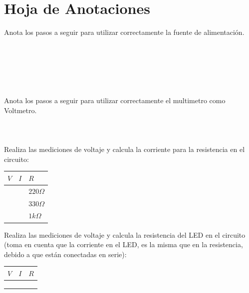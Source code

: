 
\clearpage
\section{Hoja de Anotaciones}
	Anota los pasos a seguir para utilizar correctamente la fuente de alimentación. \\ \\ \\ \\ \\ \\ \\

	Anota los pasos a seguir para utilizar correctamente el multimetro como Voltmetro. \\ \\ \\ \\

	Realiza las mediciones de voltaje y calcula la corriente para la resistencia en el circuito:

	\begin{center}
		\begin{tabular}{|p{1.5cm}|p{1.5cm}|p{1.5cm}|}
			\hline
			$V$ & $I$ & $R$          \\
			\hline
			    &     & $220 \Omega$ \\
			\hline
			    &     & $330 \Omega$ \\
			\hline
			    &     & $1 k \Omega$ \\
			\hline
		\end{tabular}
	\end{center}

	Realiza las mediciones de voltaje y calcula la resistencia del LED en el circuito (toma en cuenta que la corriente en el LED, es la misma que en la resistencia, debido a que están conectadas en serie):

	\begin{center}
		\begin{tabular}{|p{1.5cm}|p{1.5cm}|p{1.5cm}|}
			\hline
			$V$ & $I$ & $R$ \\
			\hline
			    &     &     \\
			\hline
			    &     &     \\
			\hline
			    &     &     \\
			\hline
		\end{tabular}
	\end{center}

